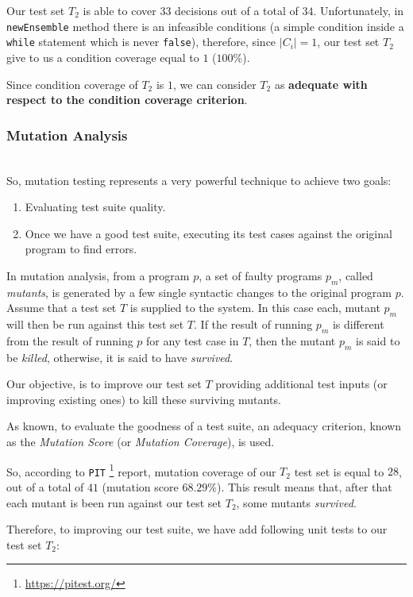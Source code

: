 \documentclass[sigconf]{acmart}
\newcommand{\abs}[1]{\left|#1\right|}
\begin{document}
Our test set $T_2$ is able to cover $33$ decisions out of a total of $34$. Unfortunately, in \texttt{newEnsemble} method there is an infeasible conditions (a simple condition inside a \texttt{while} statement which is never \texttt{false}), therefore, since $\abs{C_i} = 1$, our test set $T_2$ give to us a condition coverage equal to $1$ ($100\%$).

Since condition coverage of $T_2$ is $1$, we can consider $T_2$ as \textbf{adequate with respect to the condition coverage criterion}.

\subsubsection{Mutation Analysis}
\hfill\\
So, mutation testing represents a very powerful technique to achieve two goals\cite{mutation}:
\begin{enumerate}
\item Evaluating test suite quality.
\item Once we have a good test suite, executing its test cases against  the original program to find errors.
\end{enumerate}

In mutation analysis, from a program $p$, a set of faulty programs $p_m$, called \textit{mutants}, is generated by a few single syntactic changes to the original program $p$. Assume that a test set $T$ is supplied to the system. In this case each, mutant $p_m$ will then be run against this test set $T$. If the result of running $p_m$ is different from the result of running $p$ for any test case in $T$, then the mutant $p_m$ is said to be \textit{killed}, otherwise, it is said to have \textit{survived}\cite{mutation}.

Our objective, is to improve our test set $T$  providing additional test inputs (or improving existing ones) to kill these surviving mutants.

As known, to evaluate the goodness of a test suite, an adequacy criterion, known as the \textit{Mutation Score} (or \textit{Mutation Coverage}), is used. 

So, according to \texttt{PIT} \footnote{\url{https://pitest.org/}} report, mutation coverage of our $T_2$ test set is equal to $28$, out of a total of $41$ (mutation score $68.29 \%$). This result means that, after that each mutant is been run against our test set $T_2$, some mutants \textit{survived}. 

Therefore, to improving our test suite, we have add following unit tests to our test set $T_2$:
\end{document}
